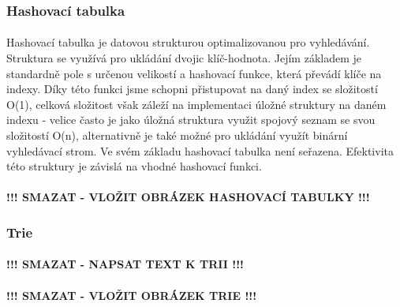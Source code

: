 ﻿\documentclass[12pt, a4paper]{article}
\begin{document}
\subsubsection{Hashovací tabulka}
\paragraph{}
Hashovací tabulka je datovou strukturou optimalizovanou pro vyhledávání. Struktura se využívá pro ukládání dvojic klíč-hodnota. Jejím základem je standardně pole s určenou velikostí a hashovací funkce, která převádí klíče na indexy. Díky této funkci jsme schopni přistupovat na daný index se složitostí O(1), celková složitost však záleží na implementaci úložné struktury na daném indexu - velice často je jako úložná struktura využit spojový seznam se svou složitostí O(n), alternativně je také možné pro ukládání využít binární vyhledávací strom. Ve svém základu hashovací tabulka není seřazena. Efektivita této struktury je závislá na vhodné hashovací funkci.

\paragraph{}
\textbf{!!! SMAZAT - VLOŽIT OBRÁZEK HASHOVACÍ TABULKY !!!}

\subsubsection{Trie}
\paragraph{}
\textbf{!!! SMAZAT - NAPSAT TEXT K TRII !!!}
\paragraph{}
\textbf{!!! SMAZAT - VLOŽIT OBRÁZEK TRIE !!!}
\end{document}
